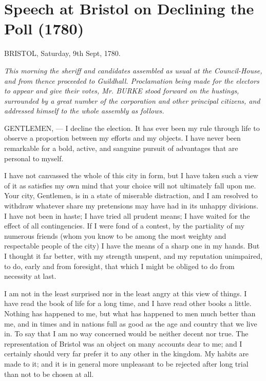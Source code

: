 



\chapter*[Speech at Bristol on Declining the Poll]{
Speech at Bristol on Declining the Poll (1780)}

\hfill BRISTOL, Saturday, 9th Sept, 1780.

\textit{This morning the sheriff and candidates assembled as usual at the Council-House, and from thence proceeded to Guildhall. Proclamation being made for the electors to appear and give their votes, Mr. BURKE stood forward on the hustings, surrounded by a great number of the corporation and other principal citizens, and addressed himself to the whole assembly as follows.}

\PRLsep

\noindent
GENTLEMEN, --- I decline the election. It has ever been my rule through life to observe a proportion between my efforts and my objects. I have never been remarkable for a bold, active, and sanguine pursuit of advantages that are personal to myself.

I have not canvassed the whole of this city in form, but I have taken such a view of it as satisfies my own mind that your choice will not ultimately fall upon me. Your city, Gentlemen, is in a state of miserable distraction, and I am resolved to withdraw whatever share my pretensions may have had in its unhappy divisions. I have not been in haste; I have tried all prudent means; I have waited for the effect of all contingencies. If I were fond of a contest, by the partiality of my numerous friends (whom you know to be among the most weighty and respectable people of the city) I have the means of a sharp one in my hands. But I thought it far better, with my strength unspent, and my reputation unimpaired, to do, early and from foresight, that which I might be obliged to do from necessity at last.

I am not in the least surprised nor in the least angry at this view of things. I have read the book of life for a long time, and I have read other books a little. Nothing has happened to me, but what has happened to men much better than me, and in times and in nations full as good as the age and country that we live in. To say that I am no way concerned would be neither decent nor true. The representation of Bristol was an object on many accounts dear to me; and I certainly should very far prefer it to any other in the kingdom. My habits are made to it; and it is in general more unpleasant to be rejected after long trial than not to be chosen at all.

